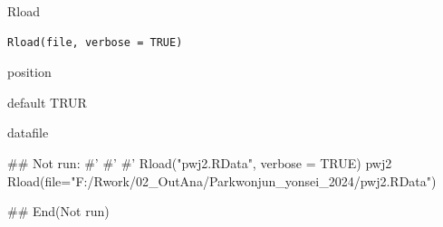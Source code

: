 \documentclass[a4paper]{book}
\begin{document}
%
\begin{Description}
Rload
\end{Description}
%
\begin{Usage}
\begin{verbatim}
Rload(file, verbose = TRUE)
\end{verbatim}
\end{Usage}
%
\begin{Arguments}
\begin{ldescription}
\item[\code{file}] position

\item[\code{verbose}] default TRUR
\end{ldescription}
\end{Arguments}
%
\begin{Value}
datafile
\end{Value}
%
\begin{Examples}
\begin{ExampleCode}

\#\# Not run: 
#'
#'
#'
Rload("pwj2.RData", verbose = TRUE)
pwj2 %
Rload(file="F:/Rwork/02_OutAna/Parkwonjun_yonsei_2024/pwj2.RData")

## End(Not run)


\end{ExampleCode}
\end{Examples}
\end{document}
